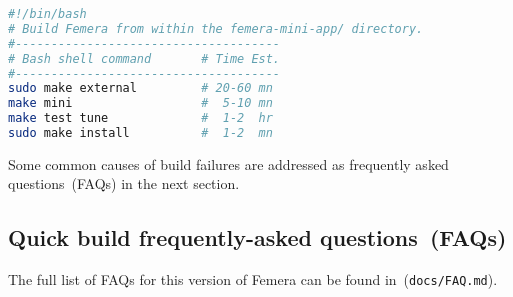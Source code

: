 \begin{center}
\begin{lstlisting}[caption={Build and install Femera in system directories.},
label={lis:quick-start-sys},language=bash,float=ht]
#!/bin/bash
# Build Femera from within the femera-mini-app/ directory.
#-------------------------------------
# Bash shell command       # Time Est.
#-------------------------------------
sudo make external         # 20-60 mn
make mini                  #  5-10 mn
make test tune             #  1-2  hr
sudo make install          #  1-2  mn
\end{lstlisting}
\begin{comment}
tdd:tests/pre-build/quick\_start\_user\_sys\_listings\_is\_same\_with\_sudo\_lines.py
\end{comment}
\end{center}

Some common causes of build failures are addressed as frequently asked
questions~(FAQs) in the next section.

\subsection{Quick build frequently-asked questions~(FAQs)\label{subsec:Quick-faqs}}

The full list of FAQs for this version of Femera can be found
in~(\texttt{docs/FAQ.md}).
\begin{comment} or at
(\texttt{https://github.com/waggyz/femera-mini-app/docs/FAQ.md}).
\end{comment}
\begin{comment}
tdd:tests/pre-build/quick\_start\_faqs\_are\_in\_docs\_FAQ\_file.py
\end{comment}

